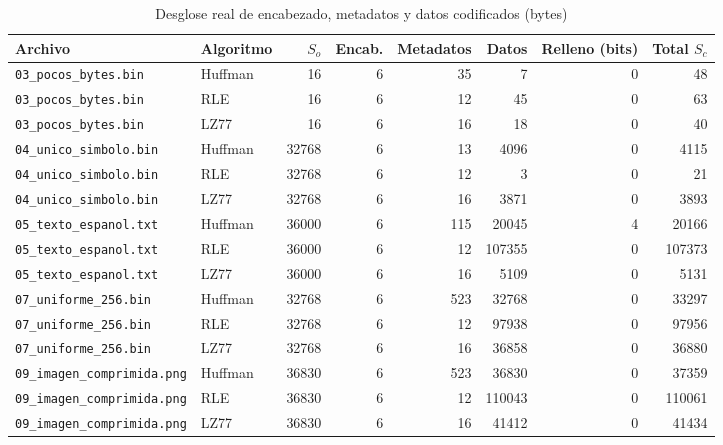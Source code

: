 \begin{table}[H]\centering\scriptsize
\caption{Desglose real de encabezado, metadatos y datos codificados (bytes)}\label{tab:metadatos}
\setlength{\tabcolsep}{4.5pt}
\begin{tabular}{@{}llrrrrrr@{}}\toprule
Archivo & Algoritmo & $S_o$ & Encab. & Metadatos & Datos & Relleno (bits) & Total $S_c$ \\ \midrule
\texttt{03\_pocos\_bytes.bin} & Huffman & 16 & 6 & 35 & 7 & 0 & 48 \\
\texttt{03\_pocos\_bytes.bin} & RLE & 16 & 6 & 12 & 45 & 0 & 63 \\
\texttt{03\_pocos\_bytes.bin} & LZ77 & 16 & 6 & 16 & 18 & 0 & 40 \\
\texttt{04\_unico\_simbolo.bin} & Huffman & 32768 & 6 & 13 & 4096 & 0 & 4115 \\
\texttt{04\_unico\_simbolo.bin} & RLE & 32768 & 6 & 12 & 3 & 0 & 21 \\
\texttt{04\_unico\_simbolo.bin} & LZ77 & 32768 & 6 & 16 & 3871 & 0 & 3893 \\
\texttt{05\_texto\_espanol.txt} & Huffman & 36000 & 6 & 115 & 20045 & 4 & 20166 \\
\texttt{05\_texto\_espanol.txt} & RLE & 36000 & 6 & 12 & 107355 & 0 & 107373 \\
\texttt{05\_texto\_espanol.txt} & LZ77 & 36000 & 6 & 16 & 5109 & 0 & 5131 \\
\texttt{07\_uniforme\_256.bin} & Huffman & 32768 & 6 & 523 & 32768 & 0 & 33297 \\
\texttt{07\_uniforme\_256.bin} & RLE & 32768 & 6 & 12 & 97938 & 0 & 97956 \\
\texttt{07\_uniforme\_256.bin} & LZ77 & 32768 & 6 & 16 & 36858 & 0 & 36880 \\
\texttt{09\_imagen\_comprimida.png} & Huffman & 36830 & 6 & 523 & 36830 & 0 & 37359 \\
\texttt{09\_imagen\_comprimida.png} & RLE & 36830 & 6 & 12 & 110043 & 0 & 110061 \\
\texttt{09\_imagen\_comprimida.png} & LZ77 & 36830 & 6 & 16 & 41412 & 0 & 41434 \\
\bottomrule\end{tabular}\end{table}
